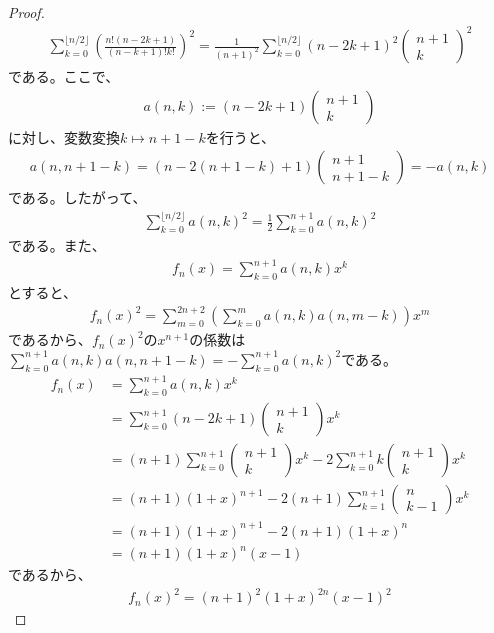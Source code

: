 \documentclass[a4paper,11pt]{jsarticle}
\theoremstyle{plain}
\theoremstyle{definition}
\renewcommand{\(}{\left(}
\renewcommand{\)}{\right)}
\renewcommand{\[}{\left[}
\renewcommand{\]}{\right]}
\renewcommand{\{}{\left\lbrace}
\renewcommand{\}}{\right\rbrace}
\newcommand{\pmat}[1]{\begin{pmatrix} #1 \end{pmatrix}}
\begin{document}
\begin{proof}
    \begin{align*}
        \sum_{k=0}^{\lfloor n/2 \rfloor} \(\frac{n! (n-2k+1)}{(n-k+1)! k!}\)^2 = \frac{1}{(n+1)^2} \sum_{k=0}^{\lfloor n/2 \rfloor} (n-2k+1)^2 \pmat{n+1 \\ k}^2
    \end{align*}
    である。ここで、
    \begin{align*}
        a(n,k) := (n-2k+1) \pmat{n+1 \\ k}
    \end{align*}
    に対し、変数変換$k \mapsto n+1-k$を行うと、
    \begin{align*}
        a(n,n+1-k) = (n-2(n+1-k)+1) \pmat{n+1 \\ n+1-k} = - a(n,k)
    \end{align*}
    である。したがって、
    \begin{align*}
        \sum_{k=0}^{\lfloor n/2 \rfloor} a(n,k)^2 = \frac{1}{2} \sum_{k=0}^{n+1} a(n,k)^2
    \end{align*}
    である。また、
    \begin{align*}
        f_n(x) = \sum_{k=0}^{n+1} a(n,k) x^k
    \end{align*}
    とすると、
    \begin{align*}
        f_n(x)^2 = \sum_{m=0}^{2n+2}\( \sum_{k=0}^{m} a(n,k) a(n,m-k)\) x^m
    \end{align*}
    であるから、$f_n(x)^2$の$x^{n+1}$の係数は$\displaystyle \sum_{k=0}^{n+1} a(n,k) a(n,n+1-k) = - \sum_{k=0}^{n+1} a(n,k)^2$である。
    \begin{align*}
        f_n(x) &= \sum_{k=0}^{n+1} a(n,k) x^k \\
        &= \sum_{k=0}^{n+1} (n-2k+1) \pmat{n+1 \\ k} x^k \\
        &= (n+1) \sum_{k=0}^{n+1} \pmat{n+1 \\ k} x^k - 2 \sum_{k=0}^{n+1} k \pmat{n+1 \\ k} x^k \\
        &= (n+1) (1+x)^{n+1} - 2(n+1) \sum_{k=1}^{n+1} \pmat{n \\ k-1} x^k \\
        &= (n+1) (1+x)^{n+1} - 2(n+1)  (1+x)^{n} \\
        &= (n+1) (1+x)^{n} (x-1)
    \end{align*}
    であるから、
    \begin{align*}
        f_n(x)^2 = (n+1)^2 (1+x)^{2n} (x-1)^2
    \end{align*}

\end{proof}
\end{document}
